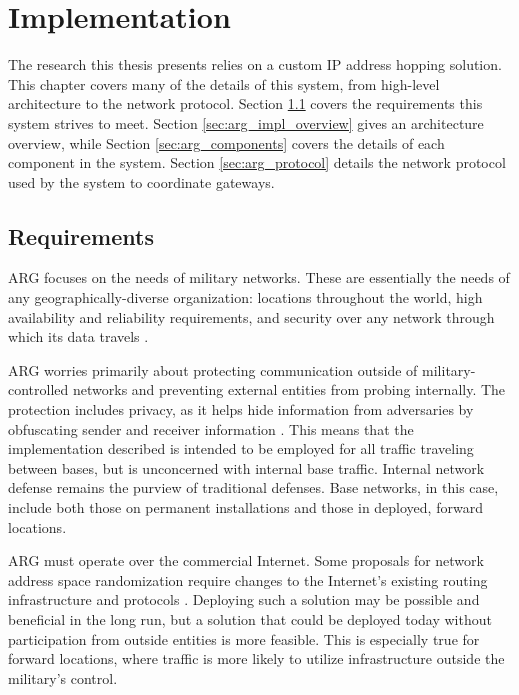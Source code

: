 \chapter{Implementation}
\label{chp:implementation}

\par The research this thesis presents relies on a custom \ac{IP} address hopping solution. This chapter covers many of the details of this system, from high-level architecture to the network protocol. Section \ref{sec:arg_requirements} covers the requirements this system strives to meet. Section \ref{sec:arg_impl_overview} gives an architecture overview, while Section \ref{sec:arg_components} covers the details of each component in the system. Section \ref{sec:arg_protocol} details the network protocol used by the system to coordinate gateways.

\section{Requirements}
\label{sec:arg_requirements}
\par \ac{ARG} focuses on the needs of military networks. These are essentially the needs of any geographically-diverse organization: locations throughout the world, high availability and reliability requirements, and security over any network through which its data travels \cite{DialInNetworking}.

\par ARG worries primarily about protecting communication outside of military-controlled networks and preventing external entities from probing internally. The protection includes privacy, as it helps hide information from adversaries by obfuscating sender and receiver information \cite{NetworkBasedPrivacy}. This means that the implementation described is intended to be employed for all traffic traveling between bases, but is unconcerned with internal base traffic. Internal network defense remains the purview of traditional defenses. Base networks, in this case, include both those on permanent installations and those in deployed, forward locations. 

\par ARG must operate over the commercial Internet. Some proposals for network address space randomization require changes to the Internet's existing routing infrastructure and protocols \cite{CONTRA}. Deploying such a solution may be possible and beneficial in the long run, but a solution that could be deployed today without participation from outside entities is more feasible. This is especially true for forward locations, where traffic is more likely to utilize infrastructure outside the military's control.

